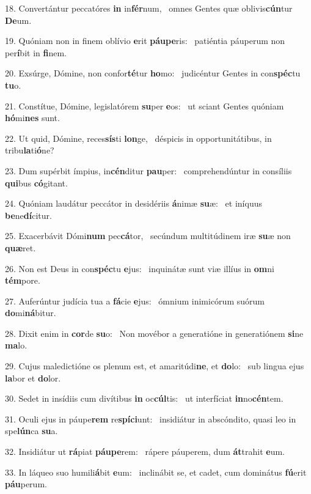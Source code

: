18. Convertántur peccatóres \textbf{in} in\textbf{fér}num, \ast\  omnes Gentes quæ oblivis\textbf{cún}tur \textbf{De}um.\

19. Quóniam non in finem oblívio \textbf{e}rit \textbf{páu}\textbf{pe}ris: \ast\  patiéntia páuperum non per\textbf{í}bit in \textbf{fi}nem.\

20. Exsúrge, Dómine, non confor\textbf{té}tur \textbf{ho}mo: \ast\  judicéntur Gentes in con\textbf{spéc}tu \textbf{tu}o.\

21. Constítue, Dómine, legislatórem \textbf{su}per \textbf{e}os: \ast\  ut sciant Gentes quóniam \textbf{hó}mi\textbf{nes} sunt.\

22. Ut quid, Dómine, reces\textbf{sís}ti \textbf{lon}ge, \ast\  déspicis in opportunitátibus, in tribu\textbf{la}ti\textbf{ó}ne?\

23. Dum supérbit ímpius, in\textbf{cén}ditur \textbf{pau}per: \ast\  comprehendúntur in consíliis \textbf{qui}bus \textbf{có}gitant.\

24. Quóniam laudátur peccátor in desidériis \textbf{á}nimæ \textbf{su}æ: \ast\  et iníquus \textbf{be}ne\textbf{dí}citur.\

25. Exacerbávit Dómi\textbf{num} pec\textbf{cá}tor, \ast\  secúndum multitúdinem iræ \textbf{su}æ non \textbf{quæ}ret.\

26. Non est Deus in con\textbf{spéc}tu \textbf{e}jus: \ast\  inquinátæ sunt viæ illíus in \textbf{om}ni \textbf{tém}pore.\

27. Auferúntur judícia tua a \textbf{fá}cie \textbf{e}jus: \ast\  ómnium inimicórum suórum \textbf{do}mi\textbf{ná}bitur.\

28. Dixit enim in \textbf{cor}de \textbf{su}o: \ast\  Non movébor a generatióne in generatiónem \textbf{si}ne \textbf{ma}lo.\

29. Cujus maledictióne os plenum est, et amaritúdi\textbf{ne}, et \textbf{do}lo: \ast\  sub lingua ejus \textbf{la}bor et \textbf{do}lor.\

30. Sedet in insídiis cum divítibus \textbf{in} oc\textbf{cúl}tis: \ast\  ut interfíciat \textbf{in}no\textbf{cén}tem.\

31. Oculi ejus in páupe\textbf{rem} re\textbf{spí}\textbf{ci}unt: \ast\  insidiátur in abscóndito, quasi leo in spe\textbf{lún}ca \textbf{su}a.\

32. Insidiátur ut \textbf{rá}piat \textbf{páu}\textbf{pe}rem: \ast\  rápere páuperem, dum \textbf{át}trahit \textbf{e}um.\

33. In láqueo suo humili\textbf{á}bit \textbf{e}um: \ast\  inclinábit se, et cadet, cum dominátus \textbf{fú}erit \textbf{páu}perum.\

